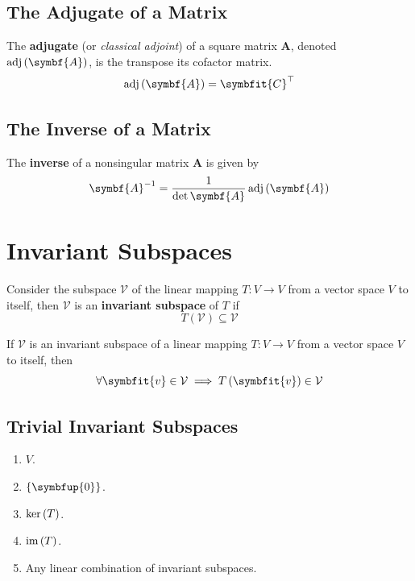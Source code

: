 \documentclass{article}
\begin{document}
\subsection{The Adjugate of a Matrix}
\begin{definition}
    The \textbf{adjugate} (or \textit{classical adjoint}) of a square
    matrix \(\symbf{A}\), denoted
    \(\adj{\left( \symbf{A} \right)}\), is the transpose its cofactor
    matrix.
    \begin{equation*}
        \adj{\left( \symbf{A} \right)} = \symbfit{C}^\top
    \end{equation*}
\end{definition}
\subsection{The Inverse of a Matrix}
\begin{theorem}
    The \textbf{inverse} of a nonsingular matrix \(\symbf{A}\) is
    given by
    \begin{equation*}
        \symbf{A}^{-1}=\frac{1}{\det{\symbf{A}}} \adj{\left( \symbf{A} \right)}
    \end{equation*}
\end{theorem}
\newpage
\section{Invariant Subspaces}
\begin{definition}
    Consider the subspace \(\mathcal{V}\) of the linear mapping
    \(T:V\rightarrow V\) from a vector space \(V\) to itself, then
    \(\mathcal{V}\) is an \textbf{invariant subspace} of \(T\) if
    \begin{equation*}
        T\left(\mathcal{V}\right)\subseteq \mathcal{V}
    \end{equation*}
\end{definition}
\begin{theorem}
    If \(\mathcal{V}\) is an invariant subspace of a linear mapping
    \(T: V \rightarrow V\) from a vector space \(V\) to itself, then
    \begin{equation*}
        \forall \symbfit{v}\in \mathcal{V}\implies T\left(\symbfit{v}\right)\in \mathcal{V}
    \end{equation*}
\end{theorem}
\subsection{Trivial Invariant Subspaces}
\begin{enumerate}
    \item \(V\).
    \item \(\left\{ \symbfup{0} \right\}\).
    \item \(\operatorname{ker}{\left( T \right)}\).
    \item \(\operatorname{im}{\left( T \right)}\).
    \item Any linear combination of invariant subspaces.
\end{enumerate}
\end{document}
